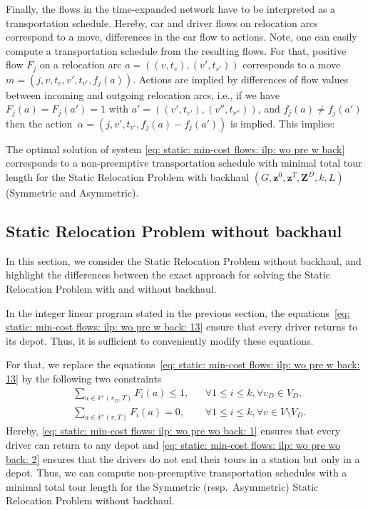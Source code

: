 \documentclass[english]{llncs}
\numberwithin{sublemma}{lemma}
\newcommand{\action}{\ensuremath{\alpha}}
\newcommand{\move}{\ensuremath{m}}
\newcommand{\fc}{\ensuremath{f}}
\newcommand{\fd}{\ensuremath{F}}
\newcommand{\z}{\boldsymbol{z}}
\newcommand{\zd}{\boldsymbol{Z}^D} \newcommand{\zzd}{Z^D}
\newcommand{\VD}{V_D}
\begin{document}
Finally, the flows in the time-expanded network have to be interpreted as a transportation schedule.
Hereby, car and driver flows on relocation arcs correspond to a move, differences in the car flow to actions.
Note, one can easily compute a transportation schedule from the resulting flows.
For that, positive flow $\fd_j$ on a relocation arc $a = ((v, t_v),(v', t_{v'}))$ corresponds to a move $\move = (j, v, t_v, v', t_{v'}, \fc_j(a))$.
Actions are implied by differences of flow values between incoming and outgoing relocation arcs, i.e., if we have~$\fd_j(a) = \fd_j(a') = 1$ with $a' = ((v',t_{v'}), (v'', t_{v''}))$,
and $\fc_j(a) \neq \fc_j(a')$ then the action~$\action = (j, v', t_{v'}, \fc_j(a) - \fc_j(a'))$ is implied.
This implies:


\begin{theorem}
The optimal solution of system \eqref{eq: static: min-cost flows: ilp: wo pre w back} corresponds to a non-preemptive transportation schedule with minimal total tour length
for the Static Relocation Problem with backhaul $(G,\z^0,\z^T, \zd, k,L)$ (Symmetric and Asymmetric).
\end{theorem}




\subsection{Static Relocation Problem without backhaul}
\label{sec: static: min-cost flows: without backhaul}


In this section, we consider the Static Relocation Problem without backhaul, and
highlight the differences between the exact approach for solving the Static Relocation Problem with and without backhaul.

In the integer linear program stated in the previous section, the equations~\eqref{eq: static: min-cost flows: ilp: wo pre w back: 13} ensure that every driver returns to its depot.
Thus, it is sufficient to conveniently modify these equations.

For that, we replace the equations~\eqref{eq: static: min-cost flows: ilp: wo pre w back: 13} by the following two constraints
\begin{align}
  & \sum_{a\in \delta^+(v_D,T)} \fd_i(a) \leq 1,                                        && \forall 1 \leq i \leq k, \forall v_D \in \VD,                  \label{eq: static: min-cost flows: ilp: wo pre wo back: 1} \\
  & \sum_{a\in \delta^+(v,T)} \fd_i(a) = 0,                                             && \forall 1 \leq i \leq k, \forall v \in V \setminus \VD.        \label{eq: static: min-cost flows: ilp: wo pre wo back: 2}
\end{align}
Hereby, \eqref{eq: static: min-cost flows: ilp: wo pre wo back: 1} ensures that every driver can return to any depot
and \eqref{eq: static: min-cost flows: ilp: wo pre wo back: 2} ensures that the drivers do not end their tours in a station but only in a depot.
Thus, we can compute non-preemptive transportation schedules with a minimal total tour length for the Symmetric (resp.~Asymmetric) Static Relocation Problem without backhaul.
\end{document}
